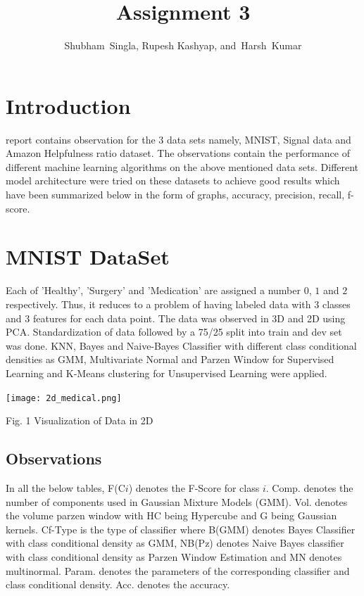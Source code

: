 \documentclass[12pt,journal,compsoc]{IEEEtran}
\begin{document}
%
\title{Assignment 3}

\author{Shubham~Singla,
        Rupesh Kashyap,
        and~Harsh~Kumar}%


\maketitle

\section{Introduction}
 report contains observation for the $3$ data sets namely, MNIST, Signal data and Amazon Helpfulness ratio dataset. The observations contain the performance of different machine learning algorithms on the above mentioned data sets. Different model architecture were tried on these datasets to achieve good results which have been summarized below in the form of graphs, accuracy, precision, recall, f-score.

\section{MNIST DataSet}
\noindent Each of 'Healthy', 'Surgery' and 'Medication' are assigned a number $0$, $1$ and $2$ respectively. Thus, it reduces to a problem of having labeled data with $3$ classes and $3$ features for each data point. The data was observed in 3D and 2D using PCA. Standardization of data followed by a 75/25 split into train and dev set was done. KNN, Bayes and Naive-Bayes Classifier with different class conditional densities as GMM, Multivariate Normal and Parzen Window for Supervised Learning and K-Means clustering for Unsupervised Learning were applied.
\begin{center}
\texttt{[image: 2d\_medical.png]}

{\small Fig. 1 Visualization of Data in 2D}
\end{center}

\subsection{Observations}
\noindent In all the below tables, F(C$i$) denotes the F-Score for class $i$. Comp. denotes the number of components used in Gaussian Mixture Models (GMM). Vol. denotes the volume parzen window with HC being Hypercube and G being Gaussian kernels. Cf-Type is the type of classifier where B(GMM) denotes Bayes Classifier with class conditional density as GMM, NB(Pz) denotes Naive Bayes classifier with class conditional density as Parzen Window Estimation and MN denotes multinormal. Param. denotes the parameters of the corresponding classifier and class conditional density. Acc. denotes the accuracy.
\end{document}
